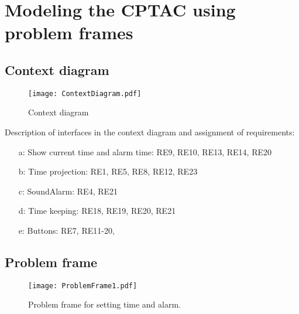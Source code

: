 \documentclass[Main_Assignment2]{subfiles}
\begin{document}
	\section{Modeling the CPTAC using problem frames}
	
		\subsection{Context diagram} %
		\label{sub:context_diagram}



		\begin{figure}[H]
		\centering
		\texttt{[image: ContextDiagram.pdf]}
		\caption{Context diagram}
		\label{fig:contextDiagram}
		\end{figure}

		Description of interfaces in the context diagram and assignment of requirements:
		
		\begin{enumerate}
			\item[a:] Show current time and alarm time: RE9, RE10, RE13, RE14, RE20
			\item[b:] Time projection: RE1, RE5, RE8, RE12, RE23
			\item[c:] SoundAlarm: RE4, RE21
			\item[d:] Time keeping: RE18, RE19, RE20, RE21
			\item[e:] Buttons: RE7, RE11-20, 
		\end{enumerate}
			

		\subsection{Problem frame} %
		\label{sub:problem_frame}
		

		\begin{figure}[H]
		\centering
		\texttt{[image: ProblemFrame1.pdf]}
		\caption{Problem frame for setting time and alarm.}
		\label{fig:problemFrame}
		\end{figure}

\end{document}
